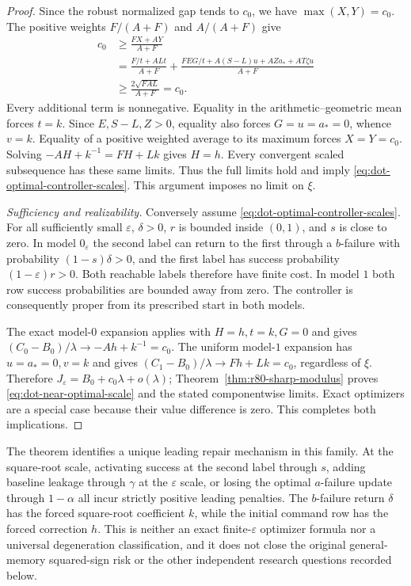 \begin{proof}
Since the robust normalized gap tends to $c_0$, we have
$\max(X,Y)=c_0$.  The positive weights $F/(A+F)$ and $A/(A+F)$
give
\begin{align*}
 c_0&\ge\frac{FX+AY}{A+F}\\
 &=\frac{F/t+ALt}{A+F}
   +\frac{FEG/t+A(S-L)u+AZa_*+AT\zeta u}{A+F}\\
 &\ge\frac{2\sqrt{FAL}}{A+F}=c_0.
\end{align*}
Every additional term is nonnegative.  Equality in the
arithmetic--geometric mean forces $t=k$.  Since $E,S-L,Z>0$,
equality also forces $G=u=a_*=0$, whence $v=k$.
Equality of a positive weighted average to its maximum forces
$X=Y=c_0$.  Solving $-AH+k^{-1}=FH+Lk$ gives $H=h$.
Every convergent scaled subsequence has these same limits.
Thus the full limits hold and imply
\eqref{eq:dot-optimal-controller-scales}.  This argument imposes no
limit on $\xi$.

\emph{Sufficiency and realizability.}
Conversely assume \eqref{eq:dot-optimal-controller-scales}.
For all sufficiently small $\varepsilon$, $\delta>0$,
$r$ is bounded inside $(0,1)$, and $s$ is close to zero.
In model $0_\varepsilon$ the second label can return to the first
through a $b$-failure with probability $(1-s)\delta>0$, and
the first label has success probability $(1-\varepsilon)r>0$.
Both reachable labels therefore have finite cost.  In model $1$
both row success probabilities are bounded away from zero.
The controller is consequently proper from its prescribed start
in both models.

The exact model-$0$ expansion applies with $H=h,t=k,G=0$ and
gives $(C_0-B_0)/\lambda\to-Ah+k^{-1}=c_0$.
The uniform model-$1$ expansion has $u=a_*=0,v=k$ and gives
$(C_1-B_0)/\lambda\to Fh+Lk=c_0$, regardless of $\xi$.
Therefore $J_\varepsilon=B_0+c_0\lambda+o(\lambda)$;
Theorem~\ref{thm:r80-sharp-modulus} proves
\eqref{eq:dot-near-optimal-scale} and the stated componentwise limits.
Exact optimizers are a special case because their value difference
is zero.  This completes both implications.
\end{proof}

The theorem identifies a unique leading repair mechanism in this
family.  At the square-root scale, activating success at the second
label through $s$, adding baseline leakage through $\gamma$ at the
$\varepsilon$ scale, or losing the optimal $a$-failure update through
$1-\alpha$ all incur strictly positive leading penalties.  The
$b$-failure return $\delta$ has the forced square-root coefficient
$k$, while the initial command row has the forced correction $h$.
This is neither an exact finite-$\varepsilon$ optimizer formula nor
a universal degeneration classification, and it does not close the
original general-memory squared-sign risk or the other independent
research questions recorded below.
